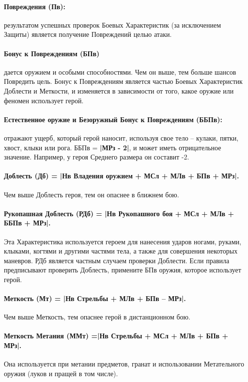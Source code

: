 \paragraph{Повреждения (Пв):} результатом успешных проверок Боевых Характеристик (за исключением Защиты) является получение Повреждений целью атаки.
\paragraph{Бонус к Повреждениям (БПв)} дается оружием и особыми способностями. Чем он выше, тем больше шансов Повредить цель. Бонус к Повреждениям является частью Боевых Характеристик Доблести и Меткости, и изменяется в зависимости от того, какое оружие или феномен использует герой.
\paragraph{Естественное оружие и Безоружный Бонус к Повреждениям (ББПв):} отражают ущерб, который герой наносит, используя свое тело – кулаки, пятки, хвост, клыки или рога. ББПв = \textbf{|МРз - 2|}, и может иметь отрицательное значение. Например, у героя Среднего размера он составит -2.
\paragraph{Доблесть (Дб) = |Нв Владения оружием + МСл + МЛв + БПв + МРз|.} Чем выше Доблесть героя, тем он опаснее в ближнем бою.
\paragraph{Рукопашная Доблесть (РДб) = |Нв Рукопашного боя + МСл + МЛв + ББПв + МРз|.} Эта Характеристика используется героем для нанесения ударов ногами, руками, клыками, когтями и другими частями тела, а также для совершения некоторых маневров.
\newline РДб является частным случаем проверки Доблести.
\newline Если правила предписывают проверить Доблесть, примените БПв оружия, которое использует герой.
\paragraph{Меткость (Мт) = |Нв Стрельбы + МЛв + БПв – МРз|.} Чем выше Меткость, тем опаснее герой в дистанционном бою. 
\paragraph{Меткость Метания (ММт) =|Нв Стрельбы + МСл + МЛв + БПв + МРз|.} Она используется при метании предметов, гранат и использовании Метательного оружия (луков и пращей в том числе). 

